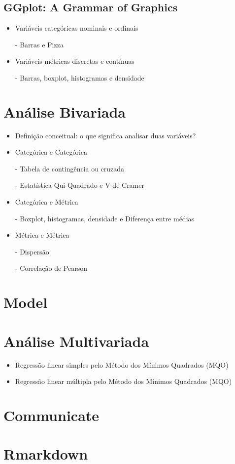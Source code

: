 \documentclass[a4paper,12pt]{article}
\begin{document}
\subsection*{GGplot: A Grammar of Graphics \cite{wickham_ggplot2_2016}}
\begin{itemize}
    \item Variáveis categóricas nominais e ordinais

    \item[-] Barras e Pizza

     \item Variáveis métricas discretas e contínuas

     \item[-] Barras, boxplot, histogramas e densidade
\end{itemize}

\pagebreak

\section*{Análise Bivariada}

\begin{itemize}
    \item Definição conceitual: o que significa analisar duas variáveis?

    \item Categórica e Categórica

    \item[-] Tabela de contingência ou cruzada

    \item[-] Estatística Qui-Quadrado e V de Cramer

     \item Categórica e Métrica

     \item[-] Boxplot, histogramas, densidade e Diferença entre médias

     \item Métrica e Métrica
     \item[-] Dispersão
     \item[-] Correlação de Pearson
     
\end{itemize}

\section{Model}
\section*{Análise Multivariada}


\begin{itemize}
    \item Regressão linear simples pelo Método dos Mínimos Quadrados (MQO)
     
     \item Regressão linear múltipla pelo Método dos Mínimos Quadrados (MQO)
     
\end{itemize}

\section{Communicate}
\section*{Rmarkdown}

\printbibliography %
\end{document}

